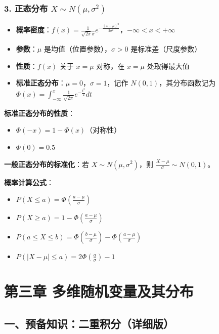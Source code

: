 \documentclass[12pt,a4paper]{ctexart}
\begin{document}
\subsubsection{3. 正态分布 $X \sim N(\mu, \sigma^2)$}
\begin{itemize}[noitemsep]
    \item \textbf{概率密度}：$f(x) = \frac{1}{\sqrt{2\pi}\sigma} e^{-\frac{(x-\mu)^2}{2\sigma^2}}$，$-\infty < x < +\infty$
    \item \textbf{参数}：$\mu$ 是均值（位置参数），$\sigma > 0$ 是标准差（尺度参数）
    \item \textbf{性质}：$f(x)$ 关于 $x = \mu$ 对称，在 $x = \mu$ 处取得最大值
    \item \textbf{标准正态分布}：$\mu = 0$，$\sigma = 1$，记作 $N(0,1)$，其分布函数记为 $\Phi(x) = \int_{-\infty}^x \frac{1}{\sqrt{2\pi}} e^{-\frac{t^2}{2}} dt$
\end{itemize}

\textbf{标准正态分布的性质}：
\begin{itemize}[noitemsep]
    \item $\Phi(-x) = 1 - \Phi(x)$（对称性）
    \item $\Phi(0) = 0.5$
\end{itemize}

\textbf{一般正态分布的标准化}：若 $X \sim N(\mu, \sigma^2)$，则 $\frac{X - \mu}{\sigma} \sim N(0,1)$。

\textbf{概率计算公式}：
\begin{itemize}[noitemsep]
    \item $P(X \le a) = \Phi\left(\frac{a-\mu}{\sigma}\right)$
    \item $P(X \ge a) = 1 - \Phi\left(\frac{a-\mu}{\sigma}\right)$
    \item $P(a \le X \le b) = \Phi\left(\frac{b-\mu}{\sigma}\right) - \Phi\left(\frac{a-\mu}{\sigma}\right)$
    \item $P(|X-\mu| \le a) = 2\Phi\left(\frac{a}{\sigma}\right) - 1$
\end{itemize}

\newpage
\section{第三章 多维随机变量及其分布}

\subsection{一、预备知识：二重积分（详细版）}
\end{document}

